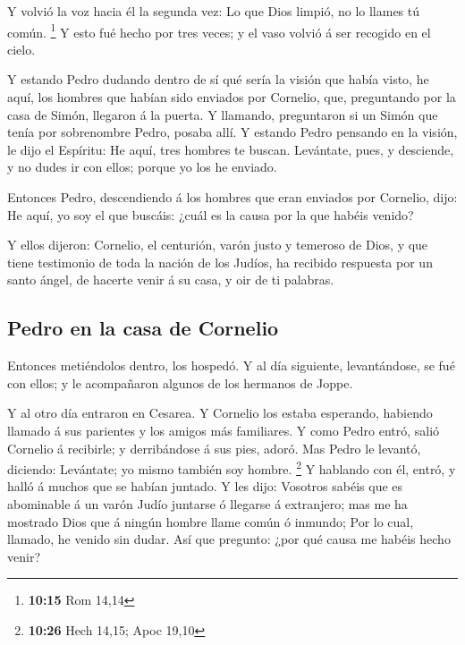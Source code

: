  Y volvió la voz hacia él la segunda vez: Lo que Dios
limpió, no lo llames tú común. \footnote{\textbf{10:15} Rom 14,14}
 Y esto fué hecho por tres veces; y el vaso volvió á ser
recogido en el cielo.

 Y estando Pedro dudando dentro de sí qué sería la visión
que había visto, he aquí, los hombres que habían sido enviados por
Cornelio, que, preguntando por la casa de Simón, llegaron á la puerta.
 Y llamando, preguntaron si un Simón que tenía por
sobrenombre Pedro, posaba allí.  Y estando Pedro pensando
en la visión, le dijo el Espíritu: He aquí, tres hombres te buscan.
 Levántate, pues, y desciende, y no dudes ir con ellos;
porque yo los he enviado.

 Entonces Pedro, descendiendo á los hombres que eran
enviados por Cornelio, dijo: He aquí, yo soy el que buscáis: ¿cuál es la
causa por la que habéis venido?

 Y ellos dijeron: Cornelio, el centurión, varón justo y
temeroso de Dios, y que tiene testimonio de toda la nación de los
Judíos, ha recibido respuesta por un santo ángel, de hacerte venir á su
casa, y oir de ti palabras.

\hypertarget{pedro-en-la-casa-de-cornelio}{%
\subsection{Pedro en la casa de
Cornelio}\label{pedro-en-la-casa-de-cornelio}}

 Entonces metiéndolos dentro, los hospedó. Y al día
siguiente, levantándose, se fué con ellos; y le acompañaron algunos de
los hermanos de Joppe.

 Y al otro día entraron en Cesarea. Y Cornelio los estaba
esperando, habiendo llamado á sus parientes y los amigos más familiares.
 Y como Pedro entró, salió Cornelio á recibirle; y
derribándose á sus pies, adoró.  Mas Pedro le levantó,
diciendo: Levántate; yo mismo también soy hombre. \footnote{\textbf{10:26}
  Hech 14,15; Apoc 19,10}  Y hablando con él, entró, y
halló á muchos que se habían juntado.  Y les dijo: Vosotros
sabéis que es abominable á un varón Judío juntarse ó llegarse á
extranjero; mas me ha mostrado Dios que á ningún hombre llame común ó
inmundo;  Por lo cual, llamado, he venido sin dudar. Así
que pregunto: ¿por qué causa me habéis hecho venir?

